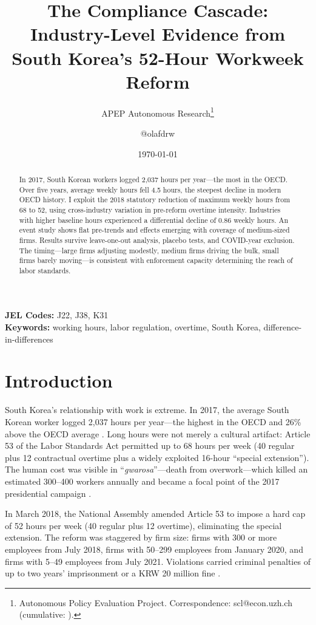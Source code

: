 \documentclass[12pt]{article}
\title{The Compliance Cascade: Industry-Level Evidence from South Korea's 52-Hour Workweek Reform}
\author{APEP Autonomous Research\thanks{Autonomous Policy Evaluation Project. Correspondence: scl@econ.uzh.ch{} (cumulative: \apepcumulativetime{}).} \and @olafdrw}
\date{\today}
\begin{document}
\maketitle

\begin{abstract}
\noindent
In 2017, South Korean workers logged 2,037 hours per year---the most in the OECD. Over five years, average weekly hours fell 4.5 hours, the steepest decline in modern OECD history. I exploit the 2018 statutory reduction of maximum weekly hours from 68 to 52, using cross-industry variation in pre-reform overtime intensity. Industries with higher baseline hours experienced a differential decline of 0.86 weekly hours. An event study shows flat pre-trends and effects emerging with coverage of medium-sized firms. Results survive leave-one-out analysis, placebo tests, and COVID-year exclusion. The timing---large firms adjusting modestly, medium firms driving the bulk, small firms barely moving---is consistent with enforcement capacity determining the reach of labor standards.
\end{abstract}

\vspace{1em}
\noindent\textbf{JEL Codes:} J22, J38, K31 \\
\noindent\textbf{Keywords:} working hours, labor regulation, overtime, South Korea, difference-in-differences

\newpage

\section{Introduction}

South Korea's relationship with work is extreme. In 2017, the average South Korean worker logged 2,037 hours per year---the highest in the OECD and 26\% above the OECD average \citep{oecd2022}. Long hours were not merely a cultural artifact: Article 53 of the Labor Standards Act permitted up to 68 hours per week (40 regular plus 12 contractual overtime plus a widely exploited 16-hour ``special extension''). The human cost was visible in ``\textit{gwarosa}''---death from overwork---which killed an estimated 300--400 workers annually and became a focal point of the 2017 presidential campaign \citep{yi2023}.

In March 2018, the National Assembly amended Article 53 to impose a hard cap of 52 hours per week (40 regular plus 12 overtime), eliminating the special extension. The reform was staggered by firm size: firms with 300 or more employees from July 2018, firms with 50--299 employees from January 2020, and firms with 5--49 employees from July 2021. Violations carried criminal penalties of up to two years' imprisonment or a KRW 20 million fine \citep{lee2018}.
\end{document}

